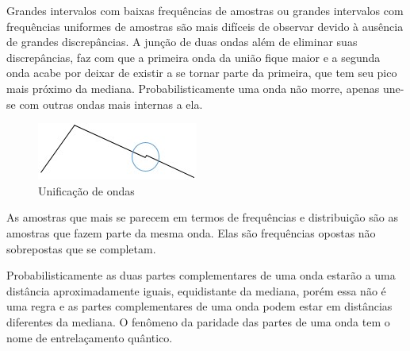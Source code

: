 Grandes intervalos com baixas frequências de amostras ou grandes intervalos com frequências uniformes de amostras são mais difíceis de observar devido à ausência de grandes discrepâncias. A junção de duas ondas além de eliminar suas discrepâncias, faz com que a primeira onda da união fique maior e a segunda onda acabe por deixar de existir a se tornar parte da primeira, que tem seu pico mais próximo da mediana. Probabilisticamente uma onda não morre, apenas une-se com outras ondas mais internas a ela.
\begin{figure}[H]
\caption{Unificação de ondas}
\label{fig:consciousness_uniform_wave}
\centering
\includegraphics[scale=1]{sections/images/consciousness_uniform_wave.jpg}
\end{figure}

As amostras que mais se parecem em termos de frequências e distribuição são as amostras que fazem parte da mesma onda. Elas são frequências opostas não sobrepostas que se completam.

Probabilisticamente as duas partes complementares de uma onda estarão a uma distância aproximadamente iguais, equidistante da mediana, porém essa não é uma regra e as partes complementares de uma onda podem estar em distâncias diferentes da mediana. O fenômeno da paridade das partes de uma onda tem o nome de entrelaçamento quântico.

